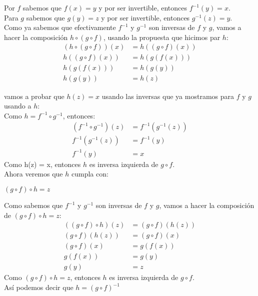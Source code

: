 \documentclass[12pt]{article}
\begin{document}
\begin{enumerate}[label=\alph*)]
    Por $f$ sabemos que $f(x) = y$ y por ser invertible, entonces $f^{-1}(y) = x$.\\

    Para $g$ sabemos que $g(y) = z$ y por ser invertible, entonces $g^{-1}(z) = y$.\\

    Como ya sabemos que efectivamente $f^{-1}$ y $g^{-1}$ son inversas de $f$ y $g$, vamos a hacer la composición $h \circ (g \circ f)$, usando 
    la propuesta que hicimos par $h$:
    \begin{align*}
        (h \circ (g \circ f))(x) &= h((g \circ f)(x))\\
        h((g \circ f)(x)) &= h(g(f(x)))\\
        h(g(f(x))) &= h(g(y))\\
        h(g(y)) &= h(z)
    \end{align*}

    vamos a probar que $h(z) = x$ usando las inversas que ya mostramos para $f$ y $g$ usando a $h$:\\

    Como $h = f^{-1} \circ g^{-1}$, entonces:
    \begin{align*}
        (f^{-1} \circ g^{-1})(z) &= f^{-1}(g^{-1}(z))\\
        f^{-1}(g^{-1}(z)) &= f^{-1}(y)\\
        f^{-1}(y) &= x
    \end{align*}
    Como h(z) = x, entonces $h$ es inversa izquierda de $g \circ f$.\\

    Ahora veremos que $h$ cumpla con:
    \begin{center}
        $(g \circ f) \circ h = z$
    \end{center}
    Como sabemos que $f^{-1}$ y $g^{-1}$ son inversas de $f$ y $g$, vamos a hacer la composición de $(g \circ f) \circ h = z$:
    \begin{align*}
        ((g \circ f) \circ h)(z) &= (g \circ f)(h(z))\\
        (g \circ f)(h(z)) &= (g \circ f)(x)\\
        (g \circ f)(x) &= g(f(x))\\
        g(f(x)) &= g(y)\\
        g(y) &= z
    \end{align*}
    Como $(g \circ f) \circ h = z$, entonces $h$ es inversa izquierda de $g \circ f$.\\

    Así podemos decir que $h = (g \circ f)^{-1}$


\end{enumerate}
\end{document}
